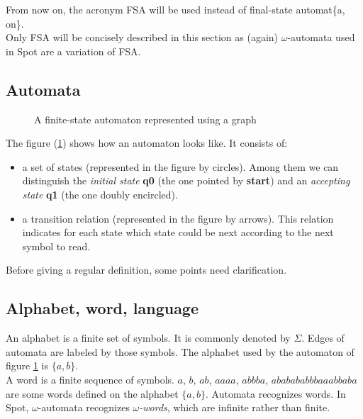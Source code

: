 \noindent From now on, the acronym FSA will be used instead of final-state automat\{a, on\}.\\

Only FSA will be concisely described in this section as (again) $\omega$-automata used in Spot are a
variation of FSA.

\subsection{Automata}
\begin{figure}[h]
  \centering
  \caption{A finite-state automaton represented using a graph}
   \label{aut:pres}
\end{figure}

The figure (\ref{aut:pres}) shows how an automaton looks like. It consists of:
\begin{itemize}
 \item a set of states (represented in the figure by circles). Among them we can distinguish the 
       \textit{initial state} \textbf{q0} (the one pointed by \textbf{start}) and an
       \textit{accepting state} \textbf{q1} (the one doubly encircled).
 \item a transition relation (represented in the figure by arrows). This relation indicates for each
       state which state could be next according to the next symbol to read.
\end{itemize}

Before giving a regular definition, some points need clarification.

\subsection{Alphabet, word, language}
An alphabet is a finite set of symbols. It is commonly denoted by $\Sigma$. Edges of automata are labeled
by those symbols. The alphabet used by the automaton of figure \ref{aut:pres} is $\{a, b\}$. \\

\noindent A word is a finite sequence of symbols. $a$, $b$, $ab$, $aaaa$, $abbba$, $ababababbbaaabbaba$ are
some words defined on the alphabet $\{a, b\}$. Automata recognizes words. In Spot, $\omega$-automata
recognizes \textit{$\omega$-words}, which are infinite rather than finite.\\

